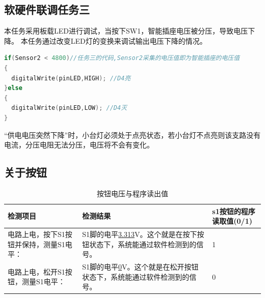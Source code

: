 \subsection{软硬件联调任务三}
本任务采用板载LED进行调试，当按下SW1，智能插座电压被分压，导致电压下降。
本任务通过改变LED灯的变换来调试输出电压下降的情况。
\begin{lstlisting}[language=C++, caption={任务三}, captionpos=b]
if(Sensor2 < 4800)//任务三的代码,Sensor2采集的电压值即为智能插座的电压值
{
  digitalWrite(pinLED,HIGH); //D4亮
}else
{
  digitalWrite(pinLED,LOW); //D4灭
}
  \end{lstlisting}
``供电电压突然下降''时，小台灯必须处于点亮状态，若小台灯不点亮则该支路没有电流，分压电阻无法分压，电压将不会有变化。
\subsection{关于按钮}
\begin{table}[H]
\centering
\caption{按钮电压与程序读出值}
\begin{tabular}{L{.3\textwidth}L{.4\textwidth}C{.2\textwidth}}
  \toprule
  检测项目  & 检测结果 & s1按钮的程序读取值(0/1)\\
  \midrule
  电路上电，按下S1按钮并保持，测量S1电平：  & S1脚的电平\underline{3.313}V。这个就是在按下按钮状态下，系统能通过软件检测到的信号。  & 1\\
  电路上电，松开S1按钮，测量S1电平：  & S1脚的电平\underline{0}V。这个就是在松开按钮状态下，系统能通过软件检测到的信号。  & 0\\
  \bottomrule
\end{tabular}
\end{table}